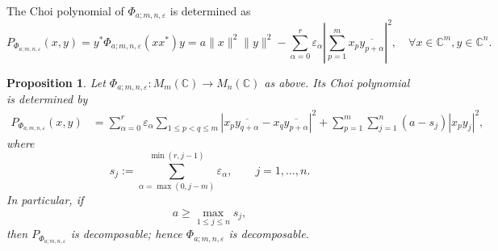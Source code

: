 \documentclass[12pt,a4paper]{amsart}
\theoremstyle{plain}
\newtheorem{proposition}[theorem]{Proposition}
\theoremstyle{remark}
\theoremstyle{definition}
\def \C {\mathbb{C}}
\begin{document}
The Choi polynomial of $\Phi_{a;m,n,\varepsilon}$ is determined as
\[
P_{\Phi_{a;m,n,\varepsilon}}(x,y)
= y^*\Phi_{a;m,n,\varepsilon} (xx^*)y = 
a\|x\|^2\|y\|^2
-
\sum_{\alpha=0}^{r}\varepsilon_\alpha
\left|\sum_{p=1}^m x_p\overline{y_{p+\alpha}}\right|^2, \quad \forall x\in \C^m, y\in \C^n.
\]
\begin{proposition}\label{Phi_eps} \rm
	Let $\Phi_{a;m,n,\varepsilon}:M_m(\mathbb C)\to M_n(\mathbb C) $ as above. Its Choi polynomial is determined by
		\[
	\begin{aligned}
		P_{\Phi_{a;m,n,\varepsilon}}(x,y)
		&=
		\sum_{\alpha=0}^{r}\varepsilon_\alpha
		\sum_{1\le p<q\le m}
		\left|x_p\overline{y_{q+\alpha}}-x_q\overline{y_{p+\alpha}}\right|^2
		+\sum_{p=1}^m\sum_{j=1}^n (a-s_j)|x_p y_j|^2,
	\end{aligned}
	\]
	where
	\[
	s_j:=\sum_{\alpha=\max(0,j-m)}^{\min(r,j-1)}\varepsilon_\alpha,
	\qquad j=1,\dots,n.
	\]
	In particular, if
	\[
	a\ge \max_{1\le j\le n}s_j,
	\]
	then $P_{\Phi_{a;m,n,\varepsilon}}$ is decomposable; hence $\Phi_{a;m,n,\varepsilon}$ is decomposable.
\end{proposition}
\end{document}
